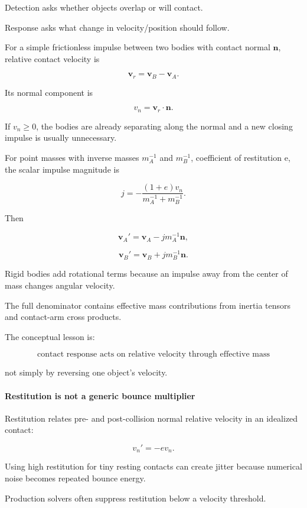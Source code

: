 Detection asks whether objects overlap or will contact.

Response asks what change in velocity/position should follow.

For a simple frictionless impulse between two bodies with contact normal \(\mathbf n\), relative contact velocity is

\[
\mathbf v_r
=
\mathbf v_B-\mathbf v_A.
\]

Its normal component is

\[
v_n=\mathbf v_r\cdot\mathbf n.
\]

If \(v_n\ge0\), the bodies are already separating along the normal and a new closing impulse is usually unnecessary.

For point masses with inverse masses \(m_A^{-1}\) and \(m_B^{-1}\), coefficient of restitution e, the scalar impulse magnitude is

\[
j
=
-\frac{(1+e)v_n}
{m_A^{-1}+m_B^{-1}}.
\]

Then

\[
\mathbf v_A'
=
\mathbf v_A
-
j m_A^{-1}\mathbf n,
\]

\[
\mathbf v_B'
=
\mathbf v_B
+
j m_B^{-1}\mathbf n.
\]

Rigid bodies add rotational terms because an impulse away from the center of mass changes angular velocity.

The full denominator contains effective mass contributions from inertia tensors and contact-arm cross products.

The conceptual lesson is:

\[
\boxed{
\text{contact response acts on relative velocity through effective mass}
}
\]

not simply by reversing one object's velocity.

\paragraph{Restitution is not a generic bounce multiplier}\label{restitution-is-not-a-generic-bounce-multiplier}

Restitution relates pre- and post-collision normal relative velocity in an idealized contact:

\[
v_n'
=
-e v_n.
\]

Using high restitution for tiny resting contacts can create jitter because numerical noise becomes repeated bounce energy.

Production solvers often suppress restitution below a velocity threshold.

